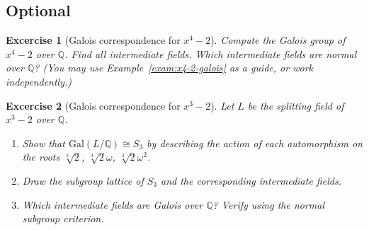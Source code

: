 \documentclass{article}
\newtheorem{exer}{Excercise}
\newcommand{\Z}{\mathbb{Z}}
\newcommand{\Q}{\mathbb{Q}}
\newcommand{\F}{\mathbb{F}}
\begin{document}

\subsection*{Optional}

\begin{exer}[Galois correspondence for $x^4-2$]\label{exer:x4-2-corr}
Compute the Galois group of $x^4 - 2$ over $\Q$. Find all intermediate fields. Which intermediate fields are normal over $\Q$? (You may use Example~\ref{exam:x4-2-galois} as a guide, or work independently.)
\end{exer}

\begin{exer}[Galois correspondence for $x^3-2$]
Let $L$ be the splitting field of $x^3-2$ over $\Q$.
\begin{enumerate}
  \item Show that $\mathrm{Gal}(L/\Q)\cong S_3$ by describing the action of each automorphism on the roots $\sqrt[3]{2}$, $\sqrt[3]{2}\omega$, $\sqrt[3]{2}\omega^2$.
  \item Draw the subgroup lattice of $S_3$ and the corresponding intermediate fields.
  \item Which intermediate fields are Galois over $\Q$? Verify using the normal subgroup criterion.
\end{enumerate}
\end{exer}
\end{document}
